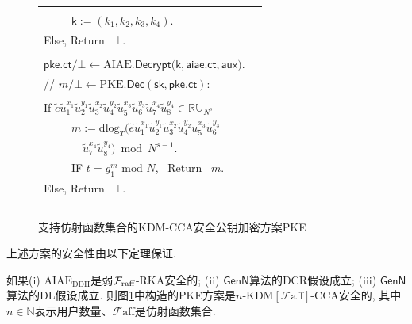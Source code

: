 {\begin{figure}[!h]
{\begin{tabular}{|l|l|}
{{{~~~~~~$\text{dlog}_T (e_4 u_4^{x_4} {u}_5^{y_4})\big) \bmod N$. \\
~~~~~$\mathsf{k} := (k_1, k_2, k_3, k_4)$.  \\
Else, Return~ $\bot$. \\}}\\
$\mathsf{pke.ct} / \bot \leftarrow \text{AIAE}.\mathsf{Decrypt}\big( \mathsf{k}, \mathsf{aiae.ct}, \textsf{aux} \big)$.  \\
// $m / \bot \leftarrow \text{PKE}.\mathsf{Dec}(\textsf{sk}, \textsf{pke.ct})$: \\
\grabox{\makecell[l]{
Parse~ $\textsf{pke.ct} = (\tilde{u}_1, \cdots, \tilde{u}_8, \tilde{e}, t)$. \\
If $\tilde{e} \tilde{u}_1^{x_1} \tilde{u}_2^{y_1} \tilde{u}_3^{x_2} \tilde{u}_4^{y_2} \tilde{u}_5^{x_3} \tilde{u}_6^{y_3} \tilde{u}_7^{x_4} \tilde{u}_8^{y_4}  \in \mathbb{RU}_{N^s}$ \\
~~~~~$m := \text{dlog}_T (\tilde{e} \tilde{u}_1^{x_1} \tilde{u}_2^{y_1} \tilde{u}_3^{x_2} \tilde{u}_4^{y_2} \tilde{u}_5^{x_3} \tilde{u}_6^{y_3}$ \\
~~~~~~~$\tilde{u}_7^{x_4} \tilde{u}_8^{y_4})  \bmod N^{s-1}$. \\
~~~~~IF $t = g_1^m \text{~mod~} N$, ~Return~ $m$. \\
Else, Return~ $\bot$. \\}
} \\
}~      
\\
\hline
\end{tabular}}
\caption{支持仿射函数集合的KDM-CCA安全公钥加密方案PKE}\label{fig:affinePKE}
\end{figure}}


上述方案的安全性由以下定理保证.
\begin{theorem} \label{thm:PKE-KDM}
如果(i) $\text{AIAE}_{\text{DDH}}$是弱$\mathcal{F}_{\text{raff}}$-RKA安全的; (ii) $\mathsf{GenN}$算法的DCR假设成立; (iii) $\mathsf{GenN}$算法的DL假设成立. 则图\ref{fig:affinePKE}中构造的PKE方案是$n$-KDM$[\mathcal{F}{\text{aff}}]$-CCA安全的, 其中$n \in \mathbb{N}$表示用户数量、$\mathcal{F}{\text{aff}}$是仿射函数集合.
\end{theorem}

